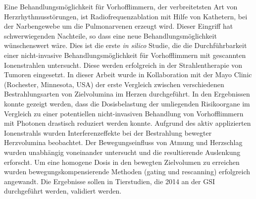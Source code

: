 Eine Behandlungsm\"oglichkeit f\"ur Vorhofflimmern, der verbreitetsten Art von Herzrhythmusst\"orungen, ist Radiofrequenzablation mit Hilfe von 
Kathetern, bei der Narbengewebe um die Pulmonarvenen erzeugt wird. Dieser Eingriff hat schwerwiegenden Nachteile, so dass eine neue  
Behandlungsm\"oglichkeit w\"unschenswert w\"are. Dies ist die erste \textit{in silico} Studie, die die 
Durchf\"uhrbarkeit einer nicht-invasive Behandlungsm\"oglichkeit f\"ur Vorhofflimmern mit gescannten Ionenstrahlen untersucht. Diese werden 
erfolgreich in der Strahlentherapie von Tumoren eingesetzt. 
In dieser Arbeit wurde in Kollaboration mit der Mayo Clinic (Rochester, Minnesota, USA) der erste Vergleich zwischen verschiedenen 
Bestrahlungsarten von Zielvolumina im Herzen durchgef\"uhrt. In den Ergebnissen konnte gezeigt werden, dass die Dosisbelastung der umliegenden 
Risikoorgane im Vergleich zu einer potentiellen nicht-invasiven Behandlung von Vorhofflimmern mit Photonen drastisch reduziert werden konnte. 
Aufgrund des aktiv applizierten Ionenstrahls wurden Interferenzeffekte bei der Bestrahlung bewegter Herzvolumina beobachtet. 
Der Bewegungseinfluss von Atmung und Herzschlag wurden unabh\"angig voneinander untersucht und die resultierende Auslenkung erforscht. 
Um eine homogene Dosis in den bewegten Zielvolumen zu erreichen wurden bewegungskompensierende Methoden (gating und rescanning) erfolgreich 
angewandt. Die Ergebnisse sollen in Tierstudien, die 2014 an der GSI durchgef\"uhrt werden, validiert werden.

% 


